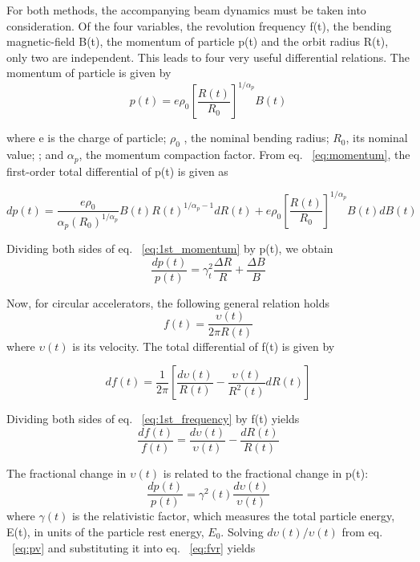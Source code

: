 For both methods, the accompanying beam dynamics must be taken into consideration. Of the four variables, the revolution frequency f(t), the bending magnetic-field B(t), the momentum of particle p(t) and the orbit radius R(t), only two are independent.  This leads to four very useful differential relations. The momentum of particle is given by
\begin{equation}
\label{eq:momentum}
p(t)=e\rho_0 [\frac {R(t)}{R_0}]^{1/\alpha_p }B(t) 
\end{equation}

where e is the charge of particle; $\rho_0$ , the nominal bending radius; $R_0$, its nominal value; ; and $\alpha_p$, the momentum compaction factor. From eq. ~\ref{eq:momentum}, the first-order total differential of p(t) is given as

\begin{equation}
\label{eq:1st_momentum}
dp(t)=\frac{e\rho_0}{\alpha_p (R_0)^{1/\alpha_p}}B(t)R(t)^{1/\alpha_p-1}dR(t)+ e\rho_0 [\frac {R(t)}{R_0}]^{1/\alpha_p }B(t)dB(t) 
\end{equation}

Dividing both sides of eq. ~\ref{eq:1st_momentum} by p(t), we obtain
\begin{equation}
\label{eq:pRB}
\frac{dp(t)}{p(t)}={\gamma_t^2}\frac{\Delta{R}}{R}+\frac{\Delta{B}}{B} 
\end{equation}

Now, for circular accelerators, the following general relation holds
\begin{equation}
\label{eq:frequency}
f(t)=\frac{\upsilon(t)}{2\pi R(t)} 
\end{equation}
where $\upsilon(t)$ is its velocity. The total differential of f(t) is given by

\begin{equation}
\label{eq:1st_frequency}
df(t)=\frac{1}{2\pi}[\frac{d\upsilon(t)}{R(t)}- \frac{\upsilon(t)}{R^2(t)}dR(t)]
\end{equation}

Dividing both sides of eq. ~\ref{eq:1st_frequency} by f(t) yields
\begin{equation}
\label{eq:fvr}
\frac{df(t)}{f(t)}=\frac{d\upsilon(t)}{\upsilon(t)}- \frac{dR(t)}{R(t)}
\end{equation}

The fractional change in $\upsilon(t)$ is related to the fractional change in p(t):
\begin{equation}
\label{eq:pv}
\frac{dp(t)}{p(t)}=\gamma^2(t)\frac{d\upsilon(t)}{\upsilon(t)}
\end{equation}
where $\gamma(t)$  is the relativistic factor, which measures the total particle energy, E(t), in units of the particle rest energy, $E_0$. Solving $d\upsilon(t)/\upsilon(t)$ from eq. ~\ref{eq:pv} and substituting it into eq. ~\ref{eq:fvr} yields

